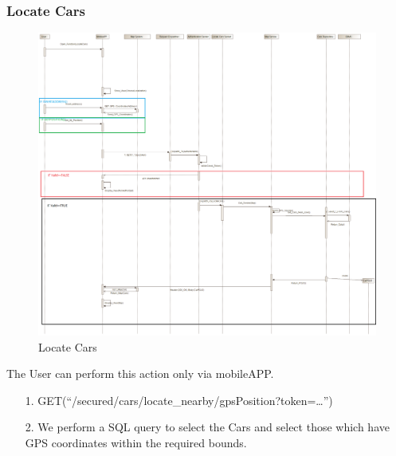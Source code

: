 \documentclass[12pt]{article}
\begin{document}
\subsubsection{Locate Cars}
\begin{figure}[h]
	\centering
	\includegraphics[width=\textwidth]{../Images/Sequence_Final/Locate_Cars}
	\caption{Locate Cars}
\end{figure}
The User can perform this action only via mobileAPP.
\begin{enumerate}
	\item[1.] GET(``/secured/cars/locate\_nearby/{gpsPosition}?token=…'')
	\item[2.] We perform a SQL query to select the Cars and select those which have GPS coordinates within the required bounds.
\end{enumerate}
\clearpage
\end{document}
